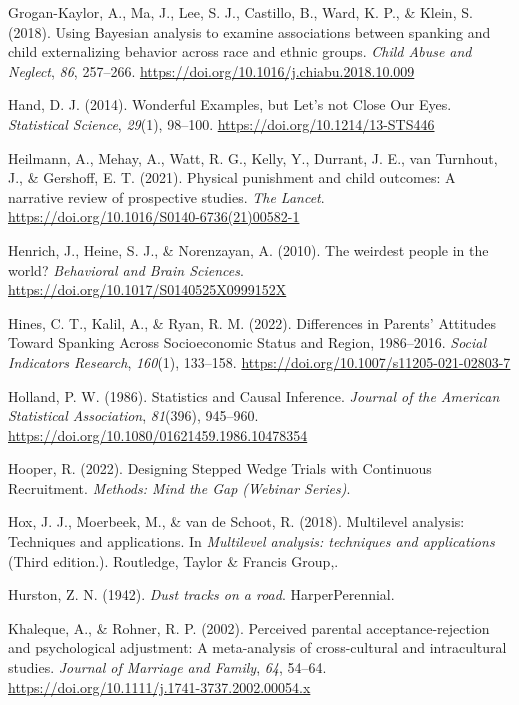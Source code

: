 \documentclass[
  letterpaper,
  DIV=11,
  numbers=noendperiod]{scrreprt}
\newlength{\cslhangindent}
\newenvironment{CSLReferences}[2] %
 {\begin{list}{}{%
  \setlength{\itemindent}{0pt}
  \setlength{\leftmargin}{0pt}
  \setlength{\parsep}{0pt}
  \ifodd #1
   \setlength{\leftmargin}{\cslhangindent}
   \setlength{\itemindent}{-1\cslhangindent}
  \fi
  \setlength{\itemsep}{#2\baselineskip}}}
 {\end{list}}
\begin{document}
\begin{CSLReferences}{1}{0}
Grogan-Kaylor, A., Ma, J., Lee, S. J., Castillo, B., Ward, K. P., \&
Klein, S. (2018). Using {B}ayesian analysis to examine associations
between spanking and child externalizing behavior across race and ethnic
groups. \emph{Child Abuse and Neglect}, \emph{86}, 257--266.
\url{https://doi.org/10.1016/j.chiabu.2018.10.009}

Hand, D. J. (2014). {Wonderful Examples, but Let's not Close Our Eyes}.
\emph{Statistical Science}, \emph{29}(1), 98--100.
\url{https://doi.org/10.1214/13-STS446}

Heilmann, A., Mehay, A., Watt, R. G., Kelly, Y., Durrant, J. E., van
Turnhout, J., \& Gershoff, E. T. (2021). Physical punishment and child
outcomes: A narrative review of prospective studies. \emph{The Lancet}.
\url{https://doi.org/10.1016/S0140-6736(21)00582-1}

Henrich, J., Heine, S. J., \& Norenzayan, A. (2010). {The weirdest
people in the world?} \emph{Behavioral and Brain Sciences}.
\url{https://doi.org/10.1017/S0140525X0999152X}

Hines, C. T., Kalil, A., \& Ryan, R. M. (2022). {Differences in Parents'
Attitudes Toward Spanking Across Socioeconomic Status and Region,
1986--2016}. \emph{Social Indicators Research}, \emph{160}(1), 133--158.
\url{https://doi.org/10.1007/s11205-021-02803-7}

Holland, P. W. (1986). {Statistics and Causal Inference}. \emph{Journal
of the American Statistical Association}, \emph{81}(396), 945--960.
\url{https://doi.org/10.1080/01621459.1986.10478354}

Hooper, R. (2022). {Designing Stepped Wedge Trials with Continuous
Recruitment}. \emph{Methods: Mind the Gap (Webinar Series)}.

Hox, J. J., Moerbeek, M., \& van de Schoot, R. (2018). Multilevel
analysis: Techniques and applications. In \emph{Multilevel analysis:
techniques and applications} (Third edition.). Routledge, Taylor \&
Francis Group,.

Hurston, Z. N. (1942). \emph{Dust tracks on a road}. HarperPerennial.

Khaleque, A., \& Rohner, R. P. (2002). Perceived parental
acceptance-rejection and psychological adjustment: A meta-analysis of
cross-cultural and intracultural studies. \emph{Journal of Marriage and
Family}, \emph{64}, 54--64.
\url{https://doi.org/10.1111/j.1741-3737.2002.00054.x}


\end{CSLReferences}
\end{document}
